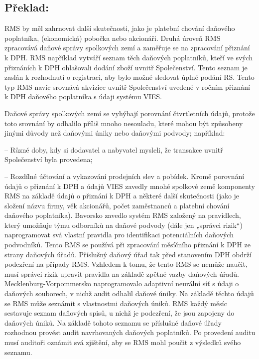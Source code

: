 \documentclass[10pt]{article}
\begin{document}
\pagebreak

\subsection*{Překlad:}

RMS by měl zahrnovat další skutečnosti, jako je platební chování daňového poplatníka, (ekonomická) pobočka nebo akcionáři.
Druhá úroveň RMS zpracovává daňové správy spolkových zemí a zaměřuje se na zpracování přiznání k DPH.
RMS například vytváří seznam těch daňových poplatníků, kteří ve svých přiznáních k DPH ohlašovali dodání zboží uvnitř Společenství.
Tento seznam je zaslán k rozhodnutí o registraci, aby bylo možné sledovat úplné podání RS.
Tento typ RMS navíc srovnává akvizice uvnitř Společenství uvedené v ročním přiznání k DPH daňového poplatníka s údaji systému VIES.


Daňové správy spolkových zemí se vyhýbají porovnání čtvrtletních údajů, protože toto srovnání by odhalilo příliš mnoho nesouladu, které mohou být způsobeny jinými důvody než daňovými úniky nebo daňovými podvody; například:



– Různé doby, kdy si dodavatel a nabyvatel mysleli, že transakce uvnitř Společenství byla provedena;

– Rozdílné účtování a vykazování prodejních slev a pobídek.
Kromě porovnání údajů o přiznání k DPH a údajů VIES zavedly mnohé spolkové země komponenty RMS na základě údajů o přiznání k DPH a některé další skutečnosti (jako je složení názvu firmy, věk akcionářů, počet zaměstnanců a platební chování daňového poplatníka).
Bavorsko zavedlo systém RMS založený na pravidlech, který umožňuje týmu odborníků na daňové podvody (dále jen „správci rizik“) naprogramovat svá vlastní pravidla pro identifikaci potenciálních daňových podvodníků.
Tento RMS se používá při zpracování měsíčního přiznání k DPH ze strany daňových úřadů.
Příslušný daňový úřad tak před stanovením DPH obdrží podezření na případy RMS.
Vzhledem k tomu, že tento RMS se nemůže naučit, musí správci rizik upravit pravidla na základě zpětné vazby daňových úřadů.
Mecklenburg-Vorpommersko naprogramovalo adaptivní neurální síť s údaji o daňových souborech, v nichž audit odhalil daňové úniky.
Na základě těchto údajů se RMS může seznámit s vlastnostmi daňových úniků.
RMS každý měsíc sestavuje seznam daňových spisů, u nichž je podezření, že jsou zapojeny do daňových úniků.
Na základě tohoto seznamu se příslušné daňové úřady rozhodnou provést audit navrhovaných daňových poplatníků.
Po provedení auditu musí auditoři oznámit svá zjištění, aby se RMS mohl poučit z výsledků svého seznamu.
\end{document}
